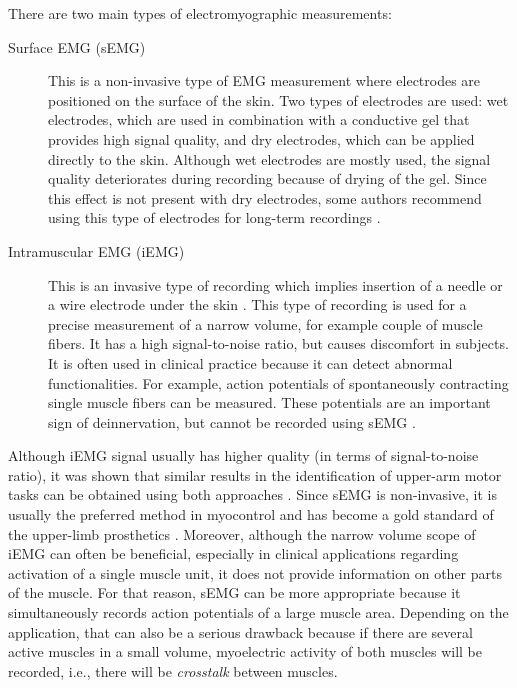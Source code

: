 There are two main types of electromyographic measurements: 
\begin{description}
\item[Surface EMG (sEMG)] This is a non-invasive type of EMG measurement where electrodes are positioned on the surface of the skin. Two types of electrodes are used: wet electrodes, which are used in combination with a conductive gel that provides high signal quality, and dry electrodes, which can be applied directly to the skin. Although wet electrodes are mostly used, the signal quality deteriorates during recording because of drying of the gel. Since this effect is not present with dry electrodes, some authors recommend using this type of electrodes for long-term recordings \citep{Merletti2009, Hakonen2015}.

\item[Intramuscular EMG (iEMG)] This is an invasive type of recording which implies insertion of a needle or a wire electrode under the skin \citep{Marateb1999}. This type of recording is used for a precise measurement of a narrow volume, for example couple of muscle fibers. It has a high signal-to-noise ratio, but causes discomfort in subjects. It is often used in clinical practice because it can detect abnormal functionalities. For example, action potentials of spontaneously contracting single muscle fibers can be measured. These potentials are an important sign of deinnervation, but cannot be recorded using sEMG \citep{Merletti-book}.
\end{description}

Although iEMG signal usually has higher quality (in terms of signal-to-noise ratio), it was shown that similar results in the identification of upper-arm motor tasks can be obtained using both approaches \citep{Hargrove2007}. Since sEMG is non-invasive, it is usually the preferred method in myocontrol and has become a gold standard of the upper-limb prosthetics \citep{Kamavuako2013}. Moreover, although the narrow volume scope of iEMG can often be beneficial, especially in clinical applications regarding activation of a single muscle unit, it does not provide information on other parts of the muscle. For that reason, sEMG can be more appropriate because it simultaneously records action potentials of a large muscle area. Depending on the application, that can also be a serious drawback because if there are several active muscles in a small volume, myoelectric activity of both muscles will be recorded, i.e., there will be \emph{crosstalk} between muscles. 


